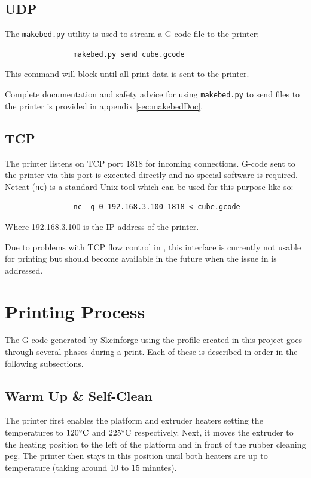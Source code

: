 		\subsection{UDP}
			
			The \verb|makebed.py| utility is used to stream a G-code file to the
			printer:
			\begin{verbatim}
				makebed.py send cube.gcode
			\end{verbatim}
			This command will block until all print data is sent to the printer.
			
			Complete documentation and safety advice for using \verb|makebed.py| to
			send files to the printer is provided in appendix \ref{sec:makebedDoc}.
			
		\subsection{TCP}
			
			The printer listens on TCP port 1818 for incoming connections. G-code sent
			to the printer via this port is executed directly and no special software
			is required. Netcat (\verb|nc|) is a standard Unix tool which can be used
			for this purpose like so:
			\begin{verbatim}
				nc -q 0 192.168.3.100 1818 < cube.gcode
			\end{verbatim}
			Where 192.168.3.100 is the IP address of the printer.
			
			Due to problems with TCP flow control in \uIP{}, this interface is
			currently not usable for printing but should become available in the
			future when the issue in \uIP{} is addressed.
	
	\section{Printing Process}
		
		The G-code generated by Skeinforge using the profile created in this project
		goes through several phases during a print. Each of these is described in
		order in the following subsections.
		
		\subsection{Warm Up \& Self-Clean}
			
			The printer first enables the platform and extruder heaters setting the
			temperatures to $120^\circ\textrm{C}$ and $225^\circ\textrm{C}$ respectively. Next, it moves the
			extruder to the heating position to the left of the platform and in front
			of the rubber cleaning peg. The printer then stays in this position until
			both heaters are up to temperature (taking around 10 to 15 minutes).
			

